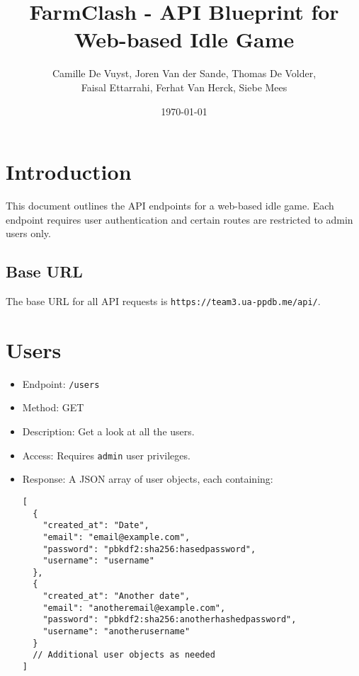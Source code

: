 \documentclass[12pt]{article}
\title{FarmClash - API Blueprint for Web-based Idle Game}
\author{Camille De Vuyst, Joren Van der Sande, Thomas De Volder,\\ Faisal Ettarrahi, Ferhat Van Herck, Siebe Mees}
\date{\today}
\begin{document}
\maketitle
\tableofcontents
\newpage

\section{Introduction}
This document outlines the API endpoints for a web-based idle game. Each endpoint requires user authentication and certain routes are restricted to admin users only.

\subsection{Base URL}
The base URL for all API requests is \texttt{https://team3.ua-ppdb.me/api/}.

\section{Users}
\begin{itemize}
    \item Endpoint: \texttt{/users}
    \item Method: GET
    \item Description: Get a look at all the users.
    \item Access: Requires \texttt{admin} user privileges.
    \item Response: A JSON array of user objects, each containing:
    \begin{verbatim}
[
  {
    "created_at": "Date",
    "email": "email@example.com",
    "password": "pbkdf2:sha256:hasedpassword",
    "username": "username"
  },
  {
    "created_at": "Another date",
    "email": "anotheremail@example.com",
    "password": "pbkdf2:sha256:anotherhashedpassword",
    "username": "anotherusername"
  }
  // Additional user objects as needed
]
    \end{verbatim}
\end{itemize}
\end{document}
